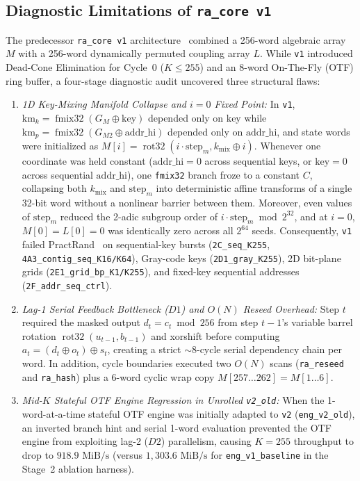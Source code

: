 \documentclass[conference]{IEEEtran}
\DeclareMathOperator{\rot}{rot32}
\DeclareMathOperator{\fmix}{fmix32}
\begin{document}
\subsection{Diagnostic Limitations of \texttt{ra\_core v1}}

The predecessor \texttt{ra\_core v1} architecture~\cite{rahman2025raprng2} combined a 256-word algebraic array $M$ with a 256-word dynamically permuted coupling array $L$. While \texttt{v1} introduced Dead-Cone Elimination for Cycle~0 ($K \le 255$) and an 8-word On-The-Fly (OTF) ring buffer, a four-stage diagnostic audit uncovered three structural flaws:
\begin{enumerate}
    \item \emph{1D Key-Mixing Manifold Collapse and $i=0$ Fixed Point:} In \texttt{v1}, $\text{km}_k = \fmix(G_M \oplus \text{key})$ depended only on $\text{key}$ while $\text{km}_p = \fmix(G_{M2} \oplus \text{addr\_hi})$ depended only on $\text{addr\_hi}$, and state words were initialized as $M[i] = \rot(i \cdot \text{step}_m, k_{\text{mix}} \oplus i)$. Whenever one coordinate was held constant ($\text{addr\_hi}=0$ across sequential keys, or $\text{key}=0$ across sequential $\text{addr\_hi}$), one \texttt{fmix32} branch froze to a constant $C$, collapsing both $k_{\text{mix}}$ and $\text{step}_m$ into deterministic affine transforms of a single 32-bit word without a nonlinear barrier between them. Moreover, even values of $\text{step}_m$ reduced the 2-adic subgroup order of $i \cdot \text{step}_m \bmod 2^{32}$, and at $i=0$, $M[0] = L[0] = 0$ was identically zero across all $2^{64}$ seeds. Consequently, \texttt{v1} failed PractRand~\cite{dotyhumphreypractrand} on sequential-key bursts (\texttt{2C\_seq\_K255}, \texttt{4A3\_contig\_seq\_K16/K64}), Gray-code keys (\texttt{2D1\_gray\_K255}), 2D bit-plane grids (\texttt{2E1\_grid\_bp\_K1/K255}), and fixed-key sequential addresses (\texttt{2F\_addr\_seq\_ctrl}).
    \item \emph{Lag-1 Serial Feedback Bottleneck ($D1$) and $O(N)$ Reseed Overhead:} Step $t$ required the masked output $d_t = c_t \bmod 256$ from step $t-1$'s variable barrel rotation $\rot(u_{t-1}, b_{t-1})$ and xorshift before computing $a_t = (d_t \oplus o_t) \oplus s_t$, creating a strict $\sim 8$-cycle serial dependency chain per word. In addition, cycle boundaries executed two $O(N)$ scans (\texttt{ra\_reseed} and \texttt{ra\_hash}) plus a 6-word cyclic wrap copy $M[257\ldots 262] = M[1\ldots 6]$.
    \item \emph{Mid-$K$ Stateful OTF Engine Regression in Unrolled \texttt{v2\_old}:} When the 1-word-at-a-time stateful OTF engine was initially adapted to \texttt{v2} (\texttt{eng\_v2\_old}), an inverted branch hint and serial 1-word evaluation prevented the OTF engine from exploiting lag-2 ($D2$) parallelism, causing $K=255$ throughput to drop to $918.9\text{ MiB/s}$ (versus $1{,}303.6\text{ MiB/s}$ for \texttt{eng\_v1\_baseline} in the Stage~2 ablation harness).
\end{enumerate}
\end{document}
